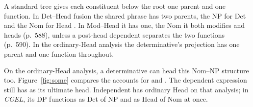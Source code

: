 \documentclass[12pt]{article}
\begin{document}
A standard tree gives each constituent below the root one parent and one function. In Det--Head fusion the shared phrase has two parents, the NP for Det and the Nom for Head \citep[582, 588]{Payne2007}. In Mod--Head it has one, the Nom it both modifies and heads (p.~588), unless a post-head dependent separates the two functions (p.~590). In the ordinary-Head analysis the determinative's projection has one parent and one function throughout.

On the ordinary-Head analysis, a determinative can head this Nom--NP structure too. Figure~\ref{fig:some} compares the accounts for  and . The dependent expression still has  as its ultimate head. Independent  has ordinary Head on that analysis; in \textit{CGEL}, its DP functions as Det of NP and as Head of Nom at once.
\end{document}
